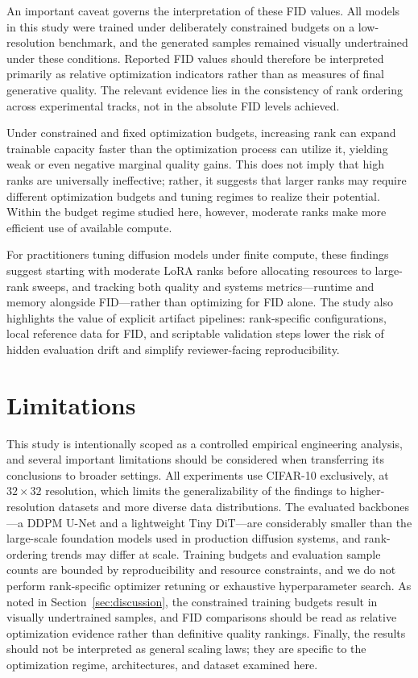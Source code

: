 \documentclass[pdflatex,sn-mathphys-num]{Springer_format/sn-jnl}
\begin{document}
  An important caveat governs the interpretation of these FID values. All models in this
  study were trained under deliberately constrained budgets on a low-resolution benchmark,
  and the generated samples remained visually undertrained under these conditions. Reported
  FID values should therefore be interpreted primarily as relative optimization indicators
  rather than as measures of final generative quality. The relevant evidence lies in the
  consistency of rank ordering across experimental tracks, not in the absolute FID levels
  achieved.
  
  Under constrained and fixed optimization budgets, increasing rank can expand trainable
  capacity faster than the optimization process can utilize it, yielding weak or even
  negative marginal quality gains. This does not imply that high ranks are universally
  ineffective; rather, it suggests that larger ranks may require different optimization
  budgets and tuning regimes to realize their potential. Within the budget regime studied
  here, however, moderate ranks make more efficient use of available compute.
  
  For practitioners tuning diffusion models under finite compute, these findings suggest
  starting with moderate LoRA ranks before allocating resources to large-rank sweeps, and
  tracking both quality and systems metrics---runtime and memory alongside FID---rather than
  optimizing for FID alone. The study also highlights the value of explicit artifact
  pipelines: rank-specific configurations, local reference data for FID, and scriptable
  validation steps lower the risk of hidden evaluation drift and simplify
  reviewer-facing reproducibility.
  
  \section{Limitations}
  \label{sec:limitations}
  
  This study is intentionally scoped as a controlled empirical engineering analysis, and
  several important limitations should be considered when transferring its conclusions to
  broader settings. All experiments use CIFAR-10 exclusively, at $32 \times 32$ resolution,
  which limits the generalizability of the findings to higher-resolution datasets and more
  diverse data distributions. The evaluated backbones---a DDPM U-Net and a lightweight Tiny
  DiT---are considerably smaller than the large-scale foundation models used in production
  diffusion systems, and rank-ordering trends may differ at scale. Training budgets and
  evaluation sample counts are bounded by reproducibility and resource constraints, and we
  do not perform rank-specific optimizer retuning or exhaustive hyperparameter search. As
  noted in Section~\ref{sec:discussion}, the constrained training budgets result in visually
  undertrained samples, and FID comparisons should be read as relative optimization evidence
  rather than definitive quality rankings. Finally, the results should not be interpreted as
  general scaling laws; they are specific to the optimization regime, architectures, and
  dataset examined here.
  
\end{document}
